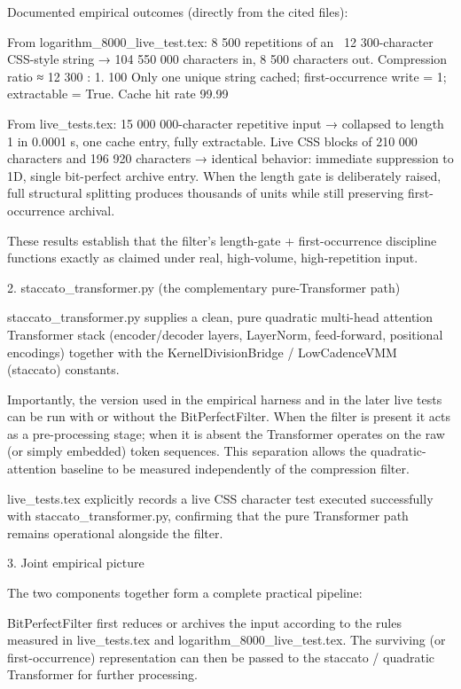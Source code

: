 Documented empirical outcomes (directly from the cited files):

From logarithm_8000_live_test.tex:
8 500 repetitions of an ~12 300-character CSS-style string → 104 550 000 characters in, 8 500 characters out.
Compression ratio ≈ 12 300 : 1.
100 %
Only one unique string cached; first-occurrence write = 1; extractable = True.
Cache hit rate 99.99 %

From live_tests.tex:
15 000 000-character repetitive input → collapsed to length 1 in 0.0001 s, one cache entry, fully extractable.
Live CSS blocks of 210 000 characters and 196 920 characters → identical behavior: immediate suppression to \x1D, single bit-perfect archive entry.
When the length gate is deliberately raised, full structural splitting produces thousands of units while still preserving first-occurrence archival.

These results establish that the filter’s length-gate + first-occurrence discipline functions exactly as claimed under real, high-volume, high-repetition input.

2. staccato_transformer.py (the complementary pure-Transformer path)

staccato_transformer.py supplies a clean, pure quadratic multi-head attention Transformer stack (encoder/decoder layers, LayerNorm, feed-forward, positional encodings) together with the KernelDivisionBridge / LowCadenceVMM (staccato) constants.  

Importantly, the version used in the empirical harness and in the later live tests can be run with or without the BitPerfectFilter. When the filter is present it acts as a pre-processing stage; when it is absent the Transformer operates on the raw (or simply embedded) token sequences. This separation allows the quadratic-attention baseline to be measured independently of the compression filter.

live_tests.tex explicitly records a live CSS character test executed successfully with staccato_transformer.py, confirming that the pure Transformer path remains operational alongside the filter.

3. Joint empirical picture

The two components together form a complete practical pipeline:

BitPerfectFilter first reduces or archives the input according to the rules measured in live_tests.tex and logarithm_8000_live_test.tex.
The surviving (or first-occurrence) representation can then be passed to the staccato / quadratic Transformer for further processing.

